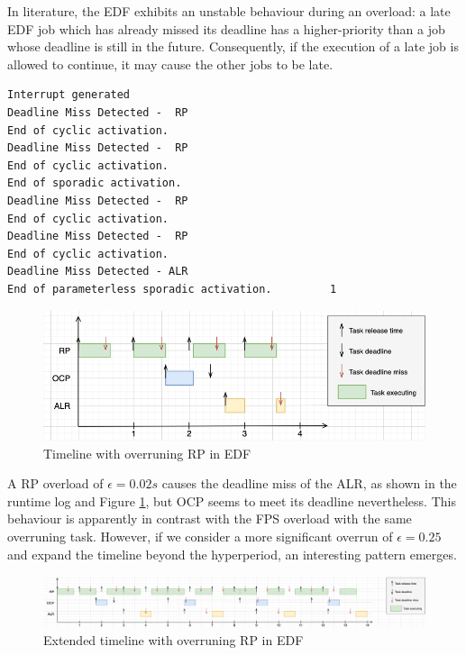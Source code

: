 \documentclass{article}
\begin{document}
In literature, the EDF exhibits an unstable behaviour during an overload: a late EDF job which has already missed its deadline has a higher-priority than a job whose deadline is still in the future. Consequently, if the execution of a late job is allowed to continue, it may cause the other jobs to be late.

\begin{lstlisting}
Interrupt generated
Deadline Miss Detected -  RP
End of cyclic activation.
Deadline Miss Detected -  RP
End of cyclic activation.
End of sporadic activation.
Deadline Miss Detected -  RP
End of cyclic activation.
Deadline Miss Detected -  RP
End of cyclic activation.
Deadline Miss Detected - ALR
End of parameterless sporadic activation.         1
\end{lstlisting}

\begin{figure}[!htbp]
\centering
\includegraphics[width=6.5in]{images/timeline-overload-edf-rp}
\caption{Timeline with overruning RP in EDF}
\label{timeline-overload-edf-rp}
\end{figure}

A RP overload of $\epsilon = 0.02s$ causes the deadline miss of the ALR, as shown in the runtime log and Figure \ref{timeline-overload-edf-rp}, but OCP seems to meet its deadline nevertheless. This behaviour is apparently in contrast with the FPS overload with the same overruning task. However, if we consider a more significant overrun of $\epsilon = 0.25$ and expand the timeline beyond the hyperperiod, an interesting pattern emerges.

\begin{figure}[!htbp]
\centering
\includegraphics[width=6.5in]{images/timeline-overload-edf-extended}
\caption{Extended timeline with overruning RP in EDF}
\label{timeline-overload-edf-extended}
\end{figure}
\end{document}
